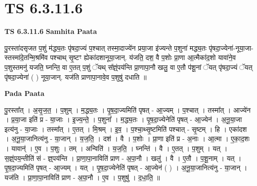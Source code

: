 \documentclass[17pt]{extarticle}
\begin{document}
\section*{ TS 6.3.11.6 }

\textbf{TS 6.3.11.6 } \newline
\textbf{Samhita Paata} \newline

पु॒रस्ता॑दसृजत प॒शुं म॑द्ध्य॒तः पृ॑षदा॒ज्यं प॒श्चात् तस्मा॒दाज्ये॑न प्रया॒जा इ॑ज्यन्ते प॒शुना॑ मद्ध्य॒तः पृ॑षदा॒ज्येना॑-नूया॒जा-स्तस्मा॑दे॒तन्मि॒श्रमि॑व पश्चाथ् सृ॒ष्टꣳ ह्येका॑दशानूया॒जान्. य॑जति॒ दश॒ वै प॒शोः प्रा॒णा आ॒त्मैका॑द॒शो यावा॑ने॒व प॒शुस्तमनु॑ यजति॒ घ्नन्ति॒ वा ए॒तत् प॒शुं ॅयथ् स᳚ज्ञ्ं॒पय॑न्ति प्रा॒णापा॒नौ खलु॒ वा ए॒तौ प॑शू॒नां ॅयत् पृ॑षदा॒ज्यं ॅयत् पृ॑षदा॒ज्येना॑ ( ) नूया॒जान्. यज॑ति प्राणापा॒नावे॒व प॒शुषु॑ दधाति ॥ \newline

\textbf{Pada Paata} \newline

पु॒रस्ता᳚त् । अ॒सृ॒ज॒त॒ । प॒शुम् । म॒द्ध्य॒तः । पृ॒ष॒दा॒ज्यमिति॑ पृषत् - आ॒ज्यम् । प॒श्चात् । तस्मा᳚त् । आज्ये॑न । प्र॒या॒जा इति॑ प्र - या॒जाः । इ॒ज्य॒न्ते॒ । प॒शुना᳚ । म॒द्ध्य॒तः । पृ॒ष॒दा॒ज्येनेति॑ पृषत् - आ॒ज्येन॑ । अ॒नू॒या॒जा इत्य॑नु - या॒जाः । तस्मा᳚त् । ए॒तत् । मि॒श्रम् । इ॒व॒ । प॒श्चा॒थ्सृ॒ष्टमिति॑ पश्चात् - सृ॒ष्टम् । हि । एका॑दश । अ॒नू॒या॒जानित्य॑नु - या॒जान् । य॒ज॒ति॒ । दश॑ । वै । प॒शोः । प्रा॒णा इति॑ प्र - अ॒नाः । आ॒त्मा । ए॒का॒द॒शः । यावान्॑ । ए॒व । प॒शुः । तम् । अन्विति॑ । य॒ज॒ति॒ । घ्नन्ति॑ । वै । ए॒तत् । प॒शुम् । यत् । स॒ज्ञ्ं॒पय॒न्तीति॑ सं - ज्ञ्॒पय॑न्ति । प्रा॒णा॒पा॒नाविति॑ प्राण - अ॒पा॒नौ । खलु॑ । वै । ए॒तौ । प॒शू॒नाम् । यत् । पृ॒ष॒दा॒ज्यमिति॑ पृषत् - आ॒ज्यम् । यत् । पृ॒ष॒दा॒ज्येनेति॑ पृषत् - आ॒ज्येन॑ ( ) । अ॒नू॒या॒जानित्य॑नु - या॒जान् । यज॑ति । प्रा॒णा॒पा॒नाविति॑ प्राण - अ॒पा॒नौ । ए॒व । प॒शुषु॑ । द॒धा॒ति॒ ॥  \newline
\end{document}
